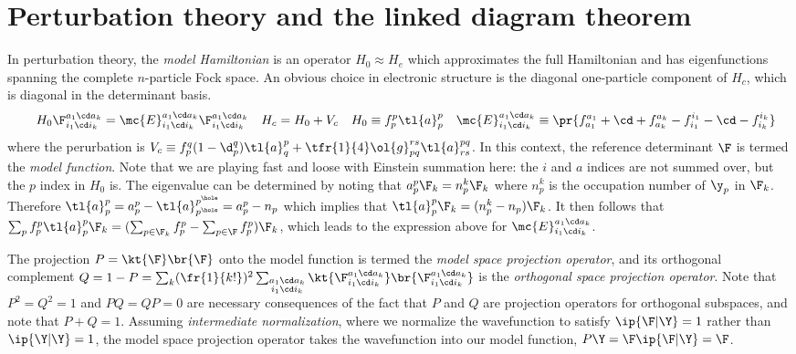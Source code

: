 \documentclass[11pt,fleqn]{article}
\numberwithin{equation}{section}
\begin{document}
\section{Perturbation theory and the linked diagram theorem}\label{sec:rspt}

\begin{dfn}\label{dfn:model-hamiltonian}
In perturbation theory, the \textit{model Hamiltonian} is an operator $H_0\approx H_e$ which approximates the full Hamiltonian and has eigenfunctions spanning the complete $n$-particle Fock space.
An obvious choice in electronic structure is the diagonal one-particle component of $H_c$, which is diagonal in the determinant basis.
\begin{align*}
&&
  H_0
  \F_{i_1\cd i_k}^{a_1\cd a_k}
=
  \mc{E}_{i_1\cd i_k}^{a_1\cd a_k}
  \F_{i_1\cd i_k}^{a_1\cd a_k}
&&
  H_c
=
  H_0
+
  V_c
&&
  H_0
\equiv
  f_p^p\tl{a}^p_p
&&
  \mc{E}_{i_1\cd i_k}^{a_1\cd a_k}
\equiv
\pr{
  f_{a_1}^{a_1}
+
  \cd
+
  f_{a_k}^{a_k}
-
  f_{i_1}^{i_1}
-
  \cd
-
  f_{i_k}^{i_k}
}
\end{align*}
where the perurbation is
$
  V_c
\equiv
  f_p^q(1-\d_p^q)
  \tl{a}^p_q
+
  \tfr{1}{4}
  \ol{g}_{pq}^{rs}
  \tl{a}^{pq}_{rs}
$.
In this context, the reference determinant $\F$ is termed the \textit{model function}.
Note that we are playing fast and loose with Einstein summation here: the $i$ and $a$ indices are not summed over, but the $p$ index in $H_0$ is.
The eigenvalue can be determined by noting that $a^p_p\F_k=n_p^k\F_k$ where $n_p^k$ is the occupation number of $\y_p$ in $\F_k$.
Therefore $\tl{a}^p_p=a^p_p-\tl{a}^{p^\hole}_{p^\hole}=a^p_p - n_p$ which implies that $\tl{a}^p_p\F_k=(n_p^k-n_p)\F_k$.
It then follows that
$
  \sum_p
  f_p^p
  \tl{a}^p_p
  \F_k
=
(
  \sum_{p\in \F_k}
  f_p^p
-
  \sum_{p\in \F}
  f_p^p
)
\F_k
$,
which leads to the expression above for $\mc{E}_{i_1\cd i_k}^{a_1\cd a_k}$.
\end{dfn}


\begin{dfn}\label{dfn:model-function}
The projection $P=\kt{\F}\br{\F}$ onto the model function is termed the \textit{model space projection operator}, and its orthogonal complement $Q=1-P=\sum_k(\fr{1}{k!})^2\sum_{\substack{a_1\cd a_k\\i_1\cd i_k}}\kt{\F_{i_1\cd i_k}^{a_1\cd a_k}}\br{\F_{i_1\cd i_k}^{a_1\cd a_k}}$ is the \textit{orthogonal space projection operator}.
Note that $P^2=Q^2=1$ and $PQ=QP=0$ are necessary consequences of the fact that $P$ and $Q$ are projection operators for orthogonal subspaces, and note that $P+Q=1$.
Assuming \textit{intermediate normalization}, where we normalize the wavefunction to satisfy $\ip{\F|\Y}=1$ rather than $\ip{\Y|\Y}=1$, the model space projection operator takes the wavefunction into our model function, $P\Y=\F\ip{\F|\Y}=\F$.
\end{dfn}
\end{document}
